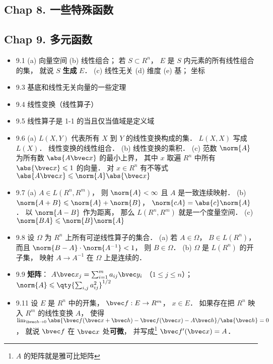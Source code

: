 \subsection{Chap 8. 一些特殊函数}

\subsection{Chap 9. 多元函数}

\begin{itemize}
\item 9.1 (a) 向量空间 (b) 线性组合； 若 $S \subset R^n$， $E$ 是 $S$ 内元素的所有线性组合的集， 就说 $S$ \textbf{生成} $E$． (c) 线性无关 (d) 维度 (e) 基； 坐标

\item 9.3 基底和线性无关向量的一些定理

\item 9.4 线性变换（线性算子）

\item 9.5 线性算子是 1-1 的当且仅当值域是定义域

\item 9.6 (a) $L(X,Y)$ 代表所有 $X$ 到 $Y$ 的线性变换构成的集． $L(X,X)$ 写成 $L(X)$． 线性变换的线性组合． (b) 线性变换的乘积． (c) 范数 $\norm{A}$ 为所有数 $\abs{A\bvec x}$ 的最小上界， 其中 $x$ 取遍 $R^n$ 中所有 $\abs{\bvec x}\leqslant 1$ 的向量． 对 $x\in R^n$ 有不等式 $\abs{A\bvec x}\leqslant \norm{A}\abs{\bvec x}$

\item 9.7 (a) $A\in L(R^n,R^m)$， 则 $\norm{A}<\infty$ 且 $A$ 是一致连续映射． (b) $\norm{A+B}\leqslant \norm{A}+\norm{B}$， $\norm{cA} = \abs{c}\norm{A}$． 以 $\norm{A-B}$ 作为距离， 那么 $L(R^n,R^m)$ 就是一个度量空间． (c) $\norm{BA} \leqslant \norm{B}\norm{A}$

\item 9.8 设 $\Omega$ 为 $R^n$ 上所有可逆线性算子的集合． (a) 若 $A\in\Omega$， $B\in L(R^n)$， 而且 $\norm{B-A}\cdot\norm{A^{-1}}<1$， 则 $B\in \Omega$． (b) $\Omega$ 是 $L(R^n)$ 的开子集， 映射 $A\to A^{-1}$ 在 $\Omega$ 上是连续的．

\item 9.9 \textbf{矩阵}： $A\bvec x_j = \sum_{i=1}^m a_{ij}\bvec y_i$ （$1\leqslant j\leqslant n$）； $\norm{A}\leqslant \qty{\sum_{i,j}a_{ij}^2}^{1/2}$

\item 9.11 设 $E$ 是 $R^n$ 中的开集， $\bvec f: E\to R^m$， $x\in E$． 如果存在把 $R^n$ 映入 $R^m$ 的线性变换 $A$， 使得 $\lim_{\bvec h\to 0} \abs{\bvec f(\bvec x+\bvec h) - \bvec f(\bvec x) - A\bvec h}/{\abs{\bvec h}} = 0$， 就说 $\bvec f$ 在 $\bvec x$ 处\textbf{可微}， 并写成\footnote{$A$ 的矩阵就是雅可比矩阵} $\bvec f'(\bvec x) = A$．


\end{itemize}
